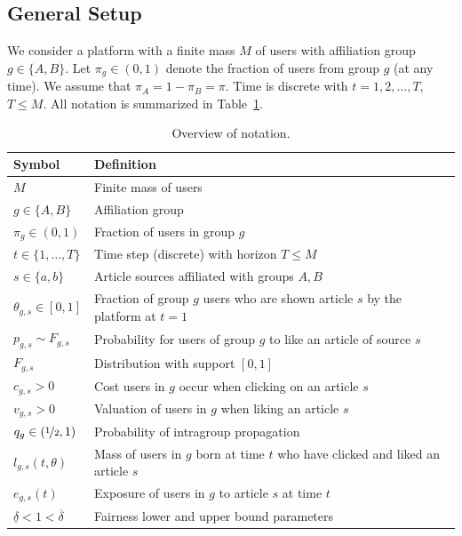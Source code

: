 \documentclass[letterpaper]{article} %
\begin{document}
\subsection{General Setup}
We consider a platform with a finite mass $M$ of users with  affiliation group $g\in\{A,B\}$.
%
Let $\pi_g\in(0,1)$ denote the fraction of users from group $g$ (at any time).
%
We assume that $\pi_A = 1-\pi_B = \pi$.
%
Time is discrete with $t=1,2, \ldots, T$, $T\leq M$.
All notation is summarized in Table~\ref{tab:overview_of_notation}.

\begin{table}[ht]
  \centering
  \begin{tabular}{ll}
    \toprule
    Symbol & Definition \\
    \midrule
    $M$ & Finite mass of users  \\
    $g\in\{A,B\}$ & Affiliation group \\
    $\pi_g\in (0,1)$ & Fraction of users in group $g$  \\
    $t\in\{1,\dots,T\}$ & Time step (discrete) with horizon $T\leq M$ \\
    $s\in \{a,b\}$ & Article sources affiliated with groups $A,B$ \\
    $\theta_{g,s} \in [0,1]$ & Fraction of group $g$ users who are shown article $s$ by the platform at $t=1$\\
    $p_{g,s} \sim F_{g,s}$ & Probability for users of group $g$ to like an article of source $s$ \\
    $F_{g,s}$ & Distribution with support $[0,1]$ \\
    $c_{g,s}>0$ & Cost users in $g$ occur when clicking on an article $s$ \\
    $v_{g,s}>0$ & Valuation of users in $g$ when liking an article $s$ \\
    $q_g \in (\nicefrac{1}{2},1)$ & Probability of intragroup propagation \\
    $l_{g,s}(t,\theta)$ & Mass of users in $g$ born at time $t$ who have clicked and liked an article $s$ \\
    $e_{g,s}(t)$ & Exposure of users in $g$ to article $s$ at time $t$ \\
    $\underline{\delta} <1 < \overline{\delta}$ & Fairness lower and upper bound parameters\\ %
    \bottomrule
  \end{tabular}  
  \caption{Overview of notation.}
  \label{tab:overview_of_notation}
\end{table}
\end{document}
